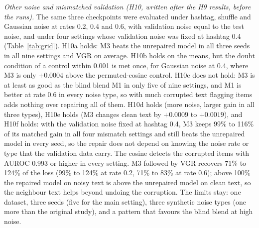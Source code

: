 \documentclass[conference]{IEEEtran}
\begin{document}
\emph{Other noise and mismatched validation (H10, written after the H9 results, before the runs).} The same three checkpoints were evaluated under hashtag, shuffle and Gaussian noise at rates 0.2, 0.4 and 0.6, with validation noise equal to the test noise, and under four settings whose validation noise was fixed at hashtag 0.4 (Table~\ref{tab:grid}). H10a holds: M3 beats the unrepaired model in all three seeds in all nine settings and VGR on average. H10b holds on the means, but the doubt condition of a control within 0.001 is met once, for Gaussian noise at 0.4, where M3 is only $+0.0004$ above the permuted-cosine control. H10c does not hold: M3 is at least as good as the blind blend M1 in only five of nine settings, and M1 is better at rate 0.6 in every noise type, so with much corrupted text flagging items adds nothing over repairing all of them. H10d holds (more noise, larger gain in all three types), H10e holds (M3 changes clean text by $+0.0009$ to $+0.0019$), and H10f holds: with the validation noise fixed at hashtag 0.4, M3 keeps 99\% to 116\% of its matched gain in all four mismatch settings and still beats the unrepaired model in every seed, so the repair does not depend on knowing the noise rate or type that the validation data carry. The cosine detects the corrupted items with AUROC 0.993 or higher in every setting. M3 followed by VGR recovers 71\% to 124\% of the loss (99\% to 124\% at rate 0.2, 71\% to 83\% at rate 0.6); above 100\% the repaired model on noisy text is above the unrepaired model on clean text, so the neighbour text helps beyond undoing the corruption. The limits stay: one dataset, three seeds (five for the main setting), three synthetic noise types (one more than the original study), and a pattern that favours the blind blend at high noise.
\end{document}
